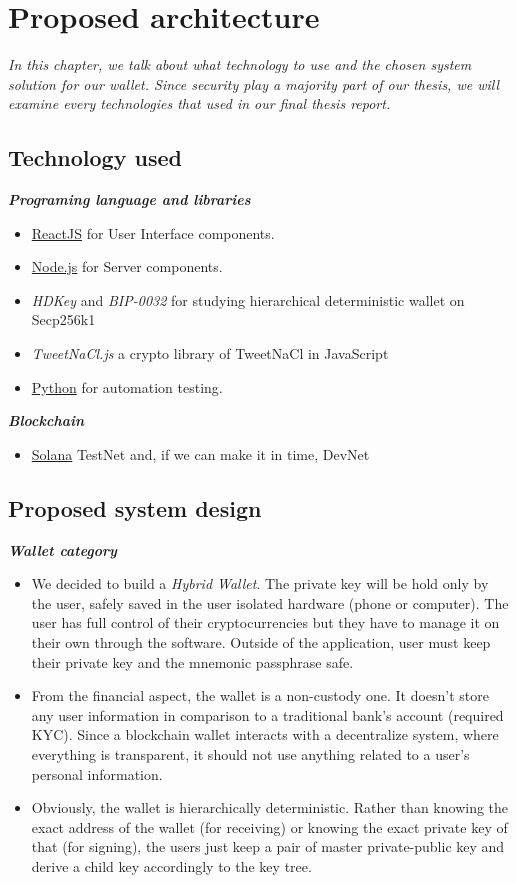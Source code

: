 \chapter{Proposed architecture} \label{chap:System_implementation}
\textit{In this chapter, we talk about what technology to use and the chosen system solution for our wallet. Since security play a majority part of our thesis, we will examine every technologies that used in our final thesis report.}
\minitoc


\section{Technology used}
{\textit {\textbf{Programing language and libraries}}}
\begin{itemize}
\item \href{https://reactjs.org/}{ReactJS} for User Interface components. 
\item \href{https://nodejs.org/en/}{Node.js} for Server components.
\item \emph{HDKey} and \emph{BIP-0032} for studying hierarchical deterministic wallet on Secp256k1
\item \emph{TweetNaCl.js} a crypto library of TweetNaCl in JavaScript
\item \href{https://www.python.org/}{Python} for automation testing.
\end{itemize}

{\textit {\textbf{Blockchain}}}
\begin{itemize}
    \item \href{https://solana.com/}{Solana} TestNet and, if we can make it in time, DevNet
\end{itemize}

\section{Proposed system design}
{\textit {\textbf{Wallet category}}}
\begin{itemize}
    \item We decided to build a \emph{Hybrid Wallet}. The private key will be hold only by the user, safely saved in the user isolated hardware (phone or computer). The user has full control of their cryptocurrencies but they have to manage it on their own through the software. Outside of the application, user must keep their private key and the mnemonic passphrase safe.
    \item From the financial aspect, the wallet is a non-custody one. It doesn't store any user information in comparison to a traditional bank's account (required KYC). Since a blockchain wallet interacts with a decentralize system, where everything is transparent, it should not use anything related to a user's personal information.
    \item Obviously, the wallet is hierarchically deterministic. Rather than knowing the exact address of the wallet (for receiving) or knowing the exact private key of that (for signing), the users just keep a pair of master private-public key and derive a child key accordingly to the key tree.
\end{itemize}

